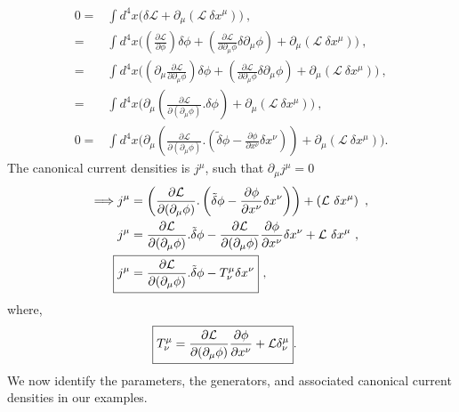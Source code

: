 \documentclass[12pt,a4paper]{report}
\begin{document}
\begin{align}
    0=&\int d^4x \bigg(\delta\mathcal{L}+\partial_\mu\left(\mathcal{L}~\delta x^\mu\right)\bigg)~,\\
    =&\int d^4x \bigg(\left(\frac{\partial\mathcal{L}}{\partial\phi}\right)\delta\phi+\left(\frac{\partial\mathcal{L}}{\partial\partial_\mu \phi}\delta\partial_\mu \phi\right)+\partial_\mu\left(\mathcal{L}~\delta x^\mu\right)\bigg)~,\nonumber\\
    =&\int d^4x \bigg(\left(\partial_\mu\frac{\partial\mathcal{L}}{\partial\partial_\mu \phi}\right)\delta\phi+\left(\frac{\partial\mathcal{L}}{\partial\partial_\mu \phi}\delta\partial_\mu \phi\right)+\partial_\mu\left(\mathcal{L}~\delta x^\mu\right)\bigg)~,\nonumber\\
    =&\int d^4x \bigg(\partial_\mu\left(\frac{\partial\mathcal{L}}{\partial(\partial_\mu\phi)}.\delta\phi\right)+\partial_\mu\left(\mathcal{L}~\delta x^\mu\right)\bigg)~,\nonumber\\
    0=&\int d^4x \bigg(\partial_\mu\left(\frac{\partial\mathcal{L}}{\partial(\partial_\mu\phi)}.\left(\tilde{\delta}\phi-\frac{\partial\phi}{\partial x^\nu}\delta x^\nu\right)\right)+\partial_\mu\left(\mathcal{L}~\delta x^\mu\right)\bigg).
\end{align}
The canonical current densities is $j^\mu$, such that $\partial_\mu j^\mu=0$ 
\begin{align}
    \Longrightarrow j^\mu&=\left(\frac{\partial\mathcal{L}}{\partial(\partial_\mu\phi)}.\left(\tilde{\delta}\phi-\frac{\partial\phi}{\partial x^\nu}\delta x^\nu\right)\right)+\left(\mathcal{L}~\delta x^\mu\right)~,\nonumber\\
    j^\mu&=\frac{\partial\mathcal{L}}{\partial(\partial_\mu\phi)}.\tilde{\delta}\phi-\frac{\partial\mathcal{L}}{\partial(\partial_\mu\phi)}\frac{\partial\phi}{\partial x^\nu}\delta x^\nu+\mathcal{L}~\delta x^\mu\nonumber~,\\
    \Aboxed{j^\mu&=\frac{\partial\mathcal{L}}{\partial(\partial_\mu\phi)}.\tilde{\delta}\phi-T^\mu_\nu \delta x^\nu}\label{J}~,\\
\end{align}
where, 
\begin{align}
    \Aboxed{T^\mu_\nu=\frac{\partial\mathcal{L}}{\partial(\partial_\mu\phi)}\frac{\partial\phi}{\partial x^\nu}+\mathcal{L}\delta^\mu_\nu}.
\end{align}
We now identify the parameters, the generators, and associated canonical current densities in our examples.
\end{document}
